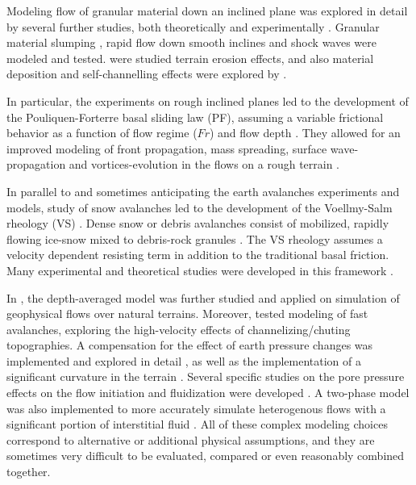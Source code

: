 \documentclass{article}
\begin{document}
Modeling flow of granular material down an inclined plane was explored in detail by several further studies, both theoretically and experimentally \citep{Pouliquen1999, RuyerQuil2000, Silbert2001, Bursik2005, DaCruz2005}. Granular material slumping \citep{Balmforth2005,Lajeunesse2005}, rapid flow down smooth inclines \citep{Greve1994,Wieland1999} and shock waves \cite{Gray2003,Hokanardottir2005} were modeled and tested. \citep{Pitman2003b, Edwards2015} were studied terrain erosion effects, and also material deposition and self-channelling effects were explored by \citep{Mangeney2005, Mangeney2007}.

In particular, the experiments on rough inclined planes led to the development of the Pouliquen-Forterre basal sliding law (PF), assuming a variable frictional behavior as a function of flow regime ($Fr$) and flow depth \citep{Pouliquen1999, ForterrePouliquen2002, PouliquenForterre2002}. They allowed for an improved modeling of front propagation, mass spreading, surface wave-propagation and vortices-evolution in the flows on a rough terrain \citep{ForterrePouliquen2003, Forterre2006, Jop2006}.

In parallel to and sometimes anticipating the earth avalanches experiments and models, study of snow avalanches led to the development of the Voellmy-Salm rheology (VS) \citep{Voellmy1955, Salm1990, Salm1993, Bartelt1999}. Dense snow or debris avalanches consist of mobilized, rapidly flowing ice-snow mixed to debris-rock granules \citep{BarteltMcArdell2009}. The VS rheology assumes a velocity dependent resisting term in addition to the traditional basal friction. Many experimental and theoretical studies were developed in this framework \citep{Gruber2007, Kern2009, Christen2010, Fischer2012}.

In \citep{Iverson1997, Iverson2001, Denlinger2001, Denlinger2004, Iverson2004}, the depth-averaged model was further studied and applied on simulation of geophysical flows over natural terrains. Moreover, \citep{Gray1999, Gray2003} tested modeling of fast avalanches, exploring the high-velocity effects of channelizing/chuting topographies. A compensation for the effect of earth pressure changes was implemented and explored in detail \citep{Pirulli2007,Pirulli2008}, as well as the implementation of a significant curvature in the terrain \citep{PudasainiHutter2003, Fischer2012}. Several specific studies on the pore pressure effects on the flow initiation and fluidization were developed \citep{SavageIverson2003, Iordanoff2004, Iverson2014}. A two-phase model was also implemented to more accurately simulate heterogenous flows with a significant portion of interstitial fluid \citep{PitmanLe2005}. All of these complex modeling choices correspond to alternative or additional physical assumptions, and they are sometimes very difficult to be evaluated, compared or even reasonably combined together.
\end{document}
